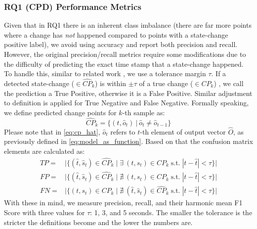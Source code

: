 \subsubsection{RQ1 (CPD) Performance Metrics} \label{sec:CPD_metrics}
Given that in RQ1 there is an inherent class imbalance (there are far more points where a change has \textit{not} happened compared to points with a state-change positive label), we avoid using accuracy and report both precision and recall. %
However, the original precision/recall metrics require some modifications due to the difficulty of predicting the exact time stamp that a state-change happened. To handle this, similar to related work \cite{Truong2018ChangePointSurvey}, we use a tolerance margin $\tau$. If a detected state-change ($\in\hat{CP}_k$) is within $\pm\tau$ of a true change ($\in{CP}_k$) , we call the prediction a True Positive, otherwise it is a False Positive. Similar adjustment to definition is applied for True Negative and False Negative. 
Formally speaking, we define predicted change points for $k$-th sample as:
\begin{equation} \label{eq:cp_hat}
\hat{CP}_k = \big\{(t, \hat{o}_t)\: |\: \hat{o}_t \neq \hat{o}_{t-1} \big\}
\end{equation}
Please note that in \eqref{eq:cp_hat}, $\hat{o}_t$ refers to $t$-th element of output vector $\hat{O}$, as previously defined in \eqref{eq:model_as_function}. Based on that the confusion matrix elements are calculated as:
\begin{equation} \label{eq:metrics}
\begin{split}
TP ={}&{}\Big|\big\{ (\hat{t}, \hat{s}_t) \in \hat{CP}_k \;\big|\; \exists\: (t, s_t) \in CP_k \;\text{s.t.}\; |t - \hat{t}| < \tau\big\}\Big| \\
FP ={}&{}\Big|\big\{ (\hat{t}, \hat{s}_t) \in \hat{CP}_k \;\big|\; \nexists\: (t, s_t) \in CP_k \;\text{s.t.}\; |t - \hat{t}| < \tau\big\}\Big| \\
FN ={}&{}\Big|\big\{ (t, s_t) \in CP_k \;\big|\; \nexists\: (\hat{t}, \hat{s}_t) \in \hat{CP}_k \;\text{s.t.}\; |t - \hat{t}| < \tau\big\}\Big| 
\end{split}
\end{equation}
With these in mind, we measure precision, recall, and their harmonic mean F1 Score with three values for $\tau$: 1, 3, and 5 seconds. The smaller the tolerance is the stricter the definitions become and the lower the numbers are. 

